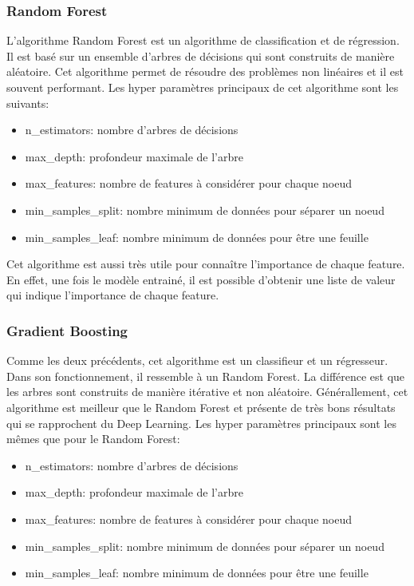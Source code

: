\subsubsection{Random Forest}
L'algorithme Random Forest est un algorithme de classification et de régression.
Il est basé sur un ensemble d'arbres de décisions qui sont construits de manière aléatoire.
Cet algorithme permet de résoudre des problèmes non linéaires et il est souvent performant.
Les hyper paramètres principaux de cet algorithme sont les suivants:
\begin{itemize}
    \item n\_estimators: nombre d'arbres de décisions
    \item max\_depth: profondeur maximale de l'arbre
    \item max\_features: nombre de features à considérer pour chaque noeud
    \item min\_samples\_split: nombre minimum de données pour séparer un noeud
    \item min\_samples\_leaf: nombre minimum de données pour être une feuille
\end{itemize}
Cet algorithme est aussi très utile pour connaître l'importance de chaque feature.
En effet, une fois le modèle entrainé, il est possible d'obtenir une liste de valeur qui indique l'importance de chaque feature.

\subsubsection{Gradient Boosting}
Comme les deux précédents, cet algorithme est un classifieur et un régresseur.
Dans son fonctionnement, il ressemble à un Random Forest.
La différence est que les arbres sont construits de manière itérative et non aléatoire.
Générallement, cet algorithme est meilleur que le Random Forest et présente de très bons résultats qui se rapprochent du Deep Learning.
Les hyper paramètres principaux sont les mêmes que pour le Random Forest:
\begin{itemize}
    \item n\_estimators: nombre d'arbres de décisions
    \item max\_depth: profondeur maximale de l'arbre
    \item max\_features: nombre de features à considérer pour chaque noeud
    \item min\_samples\_split: nombre minimum de données pour séparer un noeud
    \item min\_samples\_leaf: nombre minimum de données pour être une feuille
\end{itemize}


